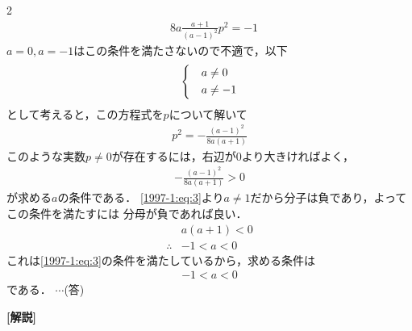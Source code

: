 \documentclass[../../../../main.tex]{subfiles}
\begin{document}
\begin{multicols}{2}
\begin{align*}
     & 8a \frac{a+1}{(a-1)^2} p^2 = -1
  \end{align*}
  $a=0, a=-1$はこの条件を満たさないので不適で，以下
  \begin{align}
    \begin{dcases}
       & a \neq 0  \\
       & a \neq -1
    \end{dcases}\label{1997-1:eq:4}
  \end{align}
  として考えると，この方程式を$p$について解いて
  \begin{align*}
    p^2 = -\frac{(a-1)^2}{8a(a+1)}
  \end{align*}
  このような実数$p\neq 0$が存在するには，右辺が$0$より大きければよく，
  \begin{align*}
    -\frac{(a-1)^2}{8a(a+1)} > 0
  \end{align*}
  が求める$a$の条件である．
  \cref{1997-1:eq:3}より$a\neq 1$だから分子は負であり，よってこの条件を満たすには
  分母が負であれば良い．
  \begin{align*}
     & a(a+1) < 0 \\
    \therefore
     & -1 < a < 0
  \end{align*}
  これは\cref{1997-1:eq:3}の条件を満たしているから，求める条件は
  \begin{align*}
    -1 < a < 0
  \end{align*}
  である． $\cdots$(答)

  \vspace{10pt}
  {\bf[解説]}

  \newpage
\end{multicols}
\end{document}
